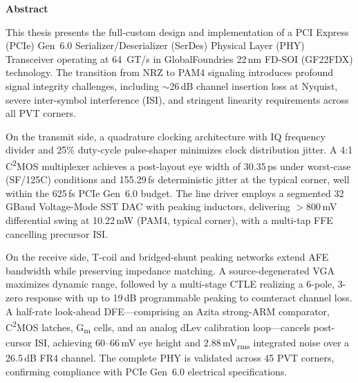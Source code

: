 \newpage    
\thispagestyle{empty}
{}

\begin{center}\huge \textbf{Abstract}\end{center}

This thesis presents the full-custom design and implementation of a PCI Express (PCIe)
Gen~6.0 Serializer/Deserializer (SerDes) Physical Layer (PHY) Transceiver operating at
64~GT/s in GlobalFoundries 22\,nm FD-SOI (GF22FDX) technology. The transition from
NRZ to PAM4 signaling introduces profound signal integrity challenges, including
$\sim$26\,dB channel insertion loss at Nyquist, severe inter-symbol interference (ISI),
and stringent linearity requirements across all PVT corners.

On the transmit side, a quadrature clocking architecture with IQ frequency divider and
25\% duty-cycle pulse-shaper minimizes clock distribution jitter. A 4:1 C\textsuperscript{2}MOS
multiplexer achieves a post-layout eye width of 30.35\,ps under worst-case (SF/125\textdegree{}C)
conditions and 155.29\,fs deterministic jitter at the typical corner, well within the
625\,fs PCIe Gen~6.0 budget. The line driver employs a segmented 32\,GBaud Voltage-Mode
SST DAC with peaking inductors, delivering $>$800\,mV differential swing at 10.22\,mW
(PAM4, typical corner), with a multi-tap FFE cancelling precursor ISI.

On the receive side, T-coil and bridged-shunt peaking networks extend AFE bandwidth
while preserving impedance matching. A source-degenerated VGA maximizes dynamic range,
followed by a multi-stage CTLE realizing a 6-pole, 3-zero response with up to 19\,dB
programmable peaking to counteract channel loss. A half-rate look-ahead DFE---comprising
an Azita strong-ARM comparator, C\textsuperscript{2}MOS latches, G\textsubscript{m}
cells, and an analog dLev calibration loop---cancels post-cursor ISI, achieving
60--66\,mV eye height and 2.88\,mV\textsubscript{rms} integrated noise over a
26.5\,dB FR4 channel. The complete PHY is validated across 45 PVT corners, confirming
compliance with PCIe Gen~6.0 electrical specifications.